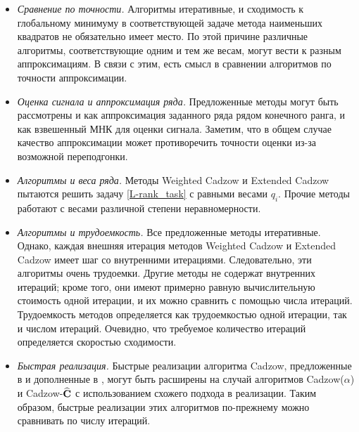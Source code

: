 \documentclass[12pt, specialist, subf,href,colorlinks=true,substylefile = spbu.rtx]{disser}
\theoremstyle{remark}
\theoremstyle{definition}
\begin{document}
\begin{itemize}
	\item \textit{Сравнение по точности.}
	Алгоритмы итеративные, и сходимость к глобальному минимуму в соответствующей задаче метода наименьших квадратов не обязательно имеет место. По этой причине различные алгоритмы, соответствующие одним и тем же весам, могут вести к разным аппроксимациям. В связи с этим, есть смысл в сравнении алгоритмов по точности аппроксимации.	
	\item \textit{Оценка сигнала и аппроксимация ряда.}
	Предложенные методы могут быть рассмотрены и как аппроксимация заданного ряда рядом конечного ранга, и как взвешенный МНК для оценки сигнала. Заметим, что в общем случае качество аппроксимации может противоречить точности оценки из-за возможной переподгонки.
	\item \textit{Алгоритмы и веса ряда.}
	Методы Weighted Cadzow и Extended Cadzow пытаются решить задачу \eqref{L-rank_task} с равными весами $q_i$. Прочие методы работают с весами различной степени неравномерности.
	\item \textit{Алгоритмы и трудоемкость.}
	Все предложенные методы итеративные. Однако, каждая внешняя итерация методов Weighted Cadzow и Extended Cadzow имеет шаг со внутренними итерациями. Следовательно, эти алгоритмы очень трудоемки. Другие методы не содержат внутренних итераций; кроме того, они имеют примерно равную вычислительную стоимость одной итерации, и их можно сравнить с помощью числа итераций.
	Трудоемкость методов определяется как трудоемкостью одной итерации, так и числом итераций. Очевидно, что требуемое количество итераций определяется скоростью сходимости.
	\item \textit{Быстрая реализация.}
	Быстрые реализации алгоритма Cadzow, предложенные в \cite{Korobeynikov2010} и дополненные в \cite{Golyandina.etal2015}, могут быть расширены на случай алгоритмов Cadzow($\alpha$) и Cadzow-$\widehat{\mathbf{C}}$ с использованием схожего подхода в реализации. Таким образом, быстрые реализации этих алгоритмов по-прежнему можно сравнивать по числу итераций.
	

\end{itemize}
\end{document}
